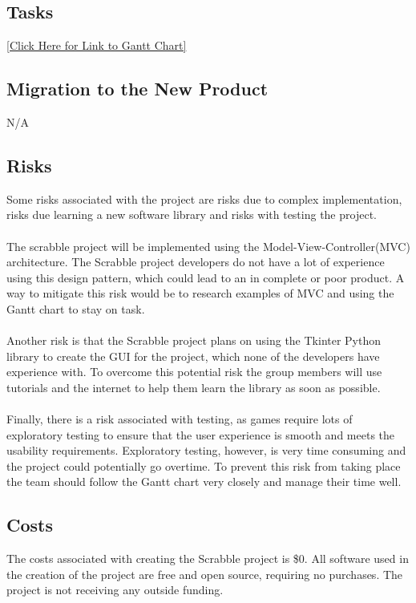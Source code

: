 \documentclass[12pt, titlepage]{article}
\begin{document}
\subsection{Tasks} %

\href{https://gitlab.cas.mcmaster.ca/choudhrk/thetrifecta_scrabble/blob/master/ProjectSchedule/3XA3\%20Gantt\%20Chart.pdf}{[Click Here for Link to Gantt Chart]}

\subsection{Migration to the New Product} %
N/A

\subsection{Risks} %
Some risks associated with the project are risks due to complex implementation, risks due learning a new software library and risks with testing the project.\\ \\
The scrabble project will be implemented using the Model-View-Controller(MVC) architecture. The Scrabble project developers do not have a lot of experience using this design pattern, which could lead to an in complete or poor product. A way to mitigate this risk would be to research examples of MVC and using the Gantt chart to stay on task.\\ \\
Another risk is that the Scrabble project plans on using the Tkinter Python library to create the GUI for the project, which none of the developers have experience with. To overcome this potential risk the group members will use tutorials and the internet to help them learn the library as soon as possible.\\ \\
Finally, there is a risk associated with testing, as games require lots of exploratory testing to ensure that the user experience is smooth and meets the usability requirements. Exploratory testing, however, is very time consuming and the project could potentially go overtime. To prevent this risk from taking place the team should follow the Gantt chart very closely and manage their time well.
\subsection{Costs}
The costs associated with creating the Scrabble project is \$0. All software used in the creation of the project are free and open source, requiring no purchases. The project is not receiving any outside funding.
\end{document}

